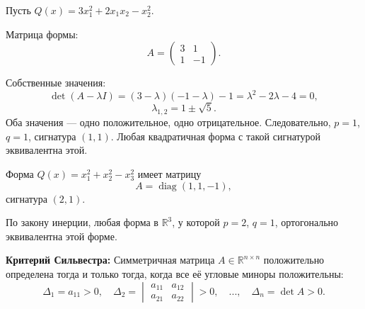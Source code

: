 \documentclass[12pt]{article}
\begin{document}
\begin{examplebox}
Пусть $Q(x) = 3x_1^2 + 2x_1x_2 - x_2^2$.

Матрица формы:
$$
A =
\begin{pmatrix}
3 & 1 \\
1 & -1
\end{pmatrix}.
$$

Собственные значения:
$$
\det(A - \lambda I) = (3-\lambda)(-1-\lambda) - 1 = \lambda^2 - 2\lambda - 4 = 0,
$$
$$
\lambda_{1,2} = 1 \pm \sqrt{5}.
$$
Оба значения — одно положительное, одно отрицательное.  
Следовательно, $p=1$, $q=1$, сигнатура $(1, 1)$.  
Любая квадратичная форма с такой сигнатурой эквивалентна этой.
\end{examplebox}

\begin{examplebox}
Форма $Q(x) = x_1^2 + x_2^2 - x_3^2$ имеет матрицу
$$
A = \operatorname{diag}(1, 1, -1),
$$
сигнатура $(2, 1)$.  

По закону инерции, любая форма в $\mathbb{R}^3$, у которой $p=2$, $q=1$, ортогонально эквивалентна этой форме.
\end{examplebox}


\begin{theorembox}
   \textbf{Критерий Сильвестра:} Симметричная матрица $ A \in \mathbb{R}^{n \times n} $ положительно определена тогда и только тогда, когда все её угловые миноры положительны:
    $$
    \Delta_1 = a_{11} > 0,\quad \Delta_2 = \begin{vmatrix} a_{11} & a_{12} \\ a_{21} & a_{22} \end{vmatrix} > 0,\quad ..., \quad \Delta_n = \det A > 0.
    $$
\end{theorembox}
\end{document}
